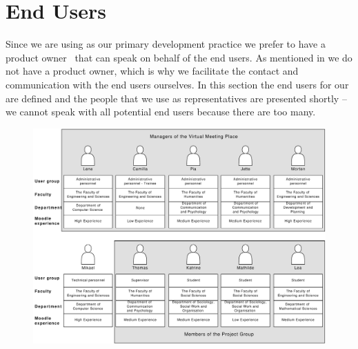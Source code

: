 \section{End Users}
\label{sec:enduser}
Since we are using \scrum{} as our primary development practice we prefer to have a product owner~\cite[p.~115]{Larman04} that can speak on behalf of the end users.
As mentioned in  we do not have a product owner, which is why we facilitate the contact and communication with the end users ourselves.
In this section the end users for our \subsystem{} are defined and the people that we use as representatives are presented shortly -- we cannot speak with all potential end users because there are too many.

\begin{landscape}
\begin{figure}[p]%
\includegraphics[scale=0.60]{images/UserGroups2}%
%
\label{fig:usergroup}%
\end{figure}
\end{landscape}

